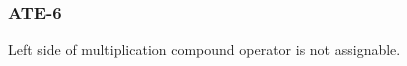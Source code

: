 \subsubsection{ATE-6}\label{sec:error_code_ate_6}

Left side of multiplication compound operator is not assignable.


